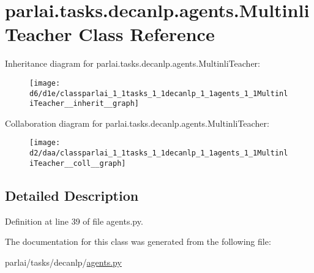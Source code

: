 \hypertarget{classparlai_1_1tasks_1_1decanlp_1_1agents_1_1MultinliTeacher}{}\section{parlai.\+tasks.\+decanlp.\+agents.\+Multinli\+Teacher Class Reference}
\label{classparlai_1_1tasks_1_1decanlp_1_1agents_1_1MultinliTeacher}


Inheritance diagram for parlai.\+tasks.\+decanlp.\+agents.\+Multinli\+Teacher\+:
\nopagebreak
\begin{figure}[H]
\begin{center}
\leavevmode
\texttt{[image: d6/d1e/classparlai\_1\_1tasks\_1\_1decanlp\_1\_1agents\_1\_1MultinliTeacher\_\_inherit\_\_graph]}
\end{center}
\end{figure}


Collaboration diagram for parlai.\+tasks.\+decanlp.\+agents.\+Multinli\+Teacher\+:
\nopagebreak
\begin{figure}[H]
\begin{center}
\leavevmode
\texttt{[image: d2/daa/classparlai\_1\_1tasks\_1\_1decanlp\_1\_1agents\_1\_1MultinliTeacher\_\_coll\_\_graph]}
\end{center}
\end{figure}


\subsection{Detailed Description}


Definition at line 39 of file agents.\+py.



The documentation for this class was generated from the following file\+:\begin{DoxyCompactItemize}
\item 
parlai/tasks/decanlp/\hyperlink{parlai_2tasks_2decanlp_2agents_8py}{agents.\+py}\end{DoxyCompactItemize}
